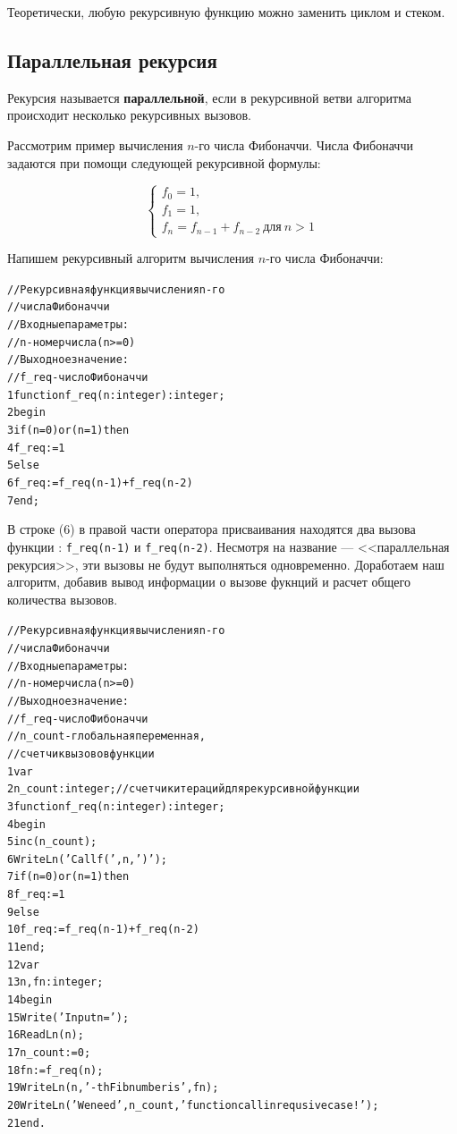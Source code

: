 \documentclass[12pt,a4paper]{article}
\begin{document}
Теоретически, любую рекурсивную функцию можно заменить циклом и стеком. 

\subsection{Параллельная рекурсия}

Рекурсия называется \textbf{параллельной}, если в рекурсивной ветви алгоритма происходит несколько рекурсивных вызовов.

Рассмотрим пример вычисления $n$-го числа Фибоначчи. Числа Фибоначчи задаются при помощи следующей рекурсивной формулы:

$$
\begin{cases}
f_0 = 1,\\
f_1 = 1,\\
f_n = f_{n-1}+f_{n-2}\ \text{для}\ n>1
\end{cases}
$$

Напишем рекурсивный алгоритм вычисления $n$-го числа Фибоначчи:

\begin{alltt}
	//Рекурсивная функция вычисления n-го
	//числа Фибоначчи
	//Входные параметры:
	//  n - номер числа (n>=0)
	//Выходное значение:
	//  f\_req - число Фибоначчи
1	function f\_req(n: integer): integer;
2	begin
3 	  if (n = 0) or (n = 1) then
4	    f\_req := 1
5	  else
6	    f\_req := f\_req(n-1) + f\_req(n-2)
7	end;
\end{alltt}

В строке (6) в правой части оператора присваивания находятся два вызова функции : \texttt{f\_req(n-1)} и \texttt{f\_req(n-2)}. Несмотря на название --- <<параллельная рекурсия>>, эти вызовы не будут выполняться одновременно. Доработаем наш алгоритм, добавив вывод информации о вызове фукнций и расчет общего количества вызовов.

\begin{alltt}
	//Рекурсивная функция вычисления n-го
	//числа Фибоначчи
	//Входные параметры:
	//  n - номер числа (n>=0)
	//Выходное значение:
	//  f\_req - число Фибоначчи
	//  n\_count - глобальная переменная,
	//            счетчик вызовов функции	
1	var
2	  n\_count: integer; //счетчик итераций для рекурсивной функции	
3	function f\_req(n: integer): integer;	
4	begin
5	  inc(n_count);
6	  WriteLn('Call f (', n, ')');	
7	  if (n = 0) or (n = 1) then
8	    f\_req := 1
9	  else
10	    f\_req := f\_req(n-1) + f\_req(n-2)
11	end;
12	var
13    n, fn: integer;
14	begin
15	  Write('Input n = ');
16	  ReadLn(n);
17	  n\_count := 0;
18	  fn := f\_req(n);
19	  WriteLn(n, '-th Fib number is ', fn);
20	  WriteLn('We need ', n\_count, ' function call in requsive case!');
21	end.	
\end{alltt}
\end{document}
